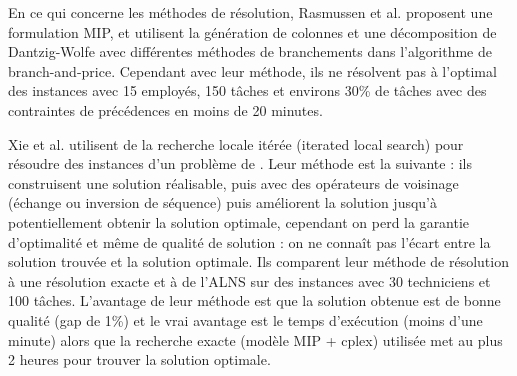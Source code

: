 \begin{comment}

\begin{figure}[H]

\centering
\begin{tikzpicture}

\node[draw,rectangle] (0) at (0,0) {\wsrp};

\node[draw,rectangle] (1) at (-2,-2) {\mpsp};
\node[draw,rectangle] (2) at (0,-2) {\vrptw};
\node[draw,rectangle] (3) at (2.5,-2) {\pdptw};

\node[draw,rectangle] (4) at (-2,-4) {\ssp};
\node[draw,rectangle] (5) at (0,-4) {\vrp};
\node[draw,rectangle] (6) at (2.5,-3) {\pdp};

\node[draw,rectangle] (7) at (-2.7,-6) {\rcpsp};
\node[draw,rectangle] (8) at (-1.2,-6) {$\ldots$};
\node[draw,rectangle] (9) at (0,-6) {\tsp};

\draw[->] (1)--(0);
\draw[->] (2)--(0);
\draw[->] (3)--(0);

\draw[->] (4)--(1);
\draw[->] (5)--(6);
\draw[->] (5)--(2);
\draw[->] (6)--(3);

\draw[->] (7)--(4);
\draw[->] (8)--(4);
\draw[->] (9)--(5);
\draw[->] (3.5,-5)--(4,-5);
\node[] at (3,-5) {A};
\node[] at (4.5,-5) {B};
\node[] at (3.75,-5.5) {$=$};
\node[] at (3.75,-6) {B généralise A};
\end{tikzpicture}

\caption{\label{Fig:Complexite} \'Evolution des problèmes : ajout de contraintes }
\end{figure}
\end{comment}

En ce qui concerne les méthodes de résolution, Rasmussen et al. \cite{Rasmussen2010} proposent une formulation MIP, et utilisent la génération de colonnes et une décomposition de Dantzig-Wolfe avec différentes méthodes de branchements dans l'algorithme de branch-and-price. Cependant avec leur méthode, ils ne résolvent pas à l'optimal des instances avec 15 employés, 150 tâches et environs 30\% de tâches avec des contraintes de précédences en moins de 20 minutes.

Xie et al. \cite{Xie2017} utilisent de la recherche locale itérée (iterated local search) pour résoudre des instances d'un problème de \wsrp.
Leur méthode est la suivante : ils construisent une solution réalisable, puis avec des opérateurs de voisinage (échange ou inversion de séquence) puis améliorent la solution jusqu'à potentiellement obtenir la solution optimale, cependant on perd la garantie d'optimalité et même de qualité de solution : on ne connaît pas l'écart entre la solution trouvée et la solution optimale.
Ils comparent leur méthode de résolution à une résolution exacte et à de l'ALNS sur des instances avec 30 techniciens et 100 tâches.
L'avantage de leur méthode est que la solution obtenue est de bonne qualité (gap de 1\%) et le vrai avantage est le temps d'exécution (moins d'une minute) alors que la recherche exacte (modèle MIP + cplex) utilisée met au plus 2 heures pour trouver la solution optimale.
